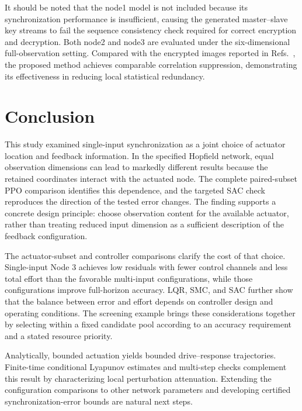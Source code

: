 \documentclass[a4paper,fleqn]{cas-dc}
\theoremstyle{plain}
\theoremstyle{definition}
\begin{document}
It should be noted that the node1 model is not included because its synchronization performance is insufficient, causing the generated master--slave key streams to fail the sequence consistency check required for correct encryption and decryption. Both node2 and node3 are evaluated under the six-dimensional full-observation setting. Compared with the encrypted images reported in Refs.~\cite{li2024novel,verma2025quantum}, the proposed method achieves comparable correlation suppression, demonstrating its effectiveness in reducing local statistical redundancy.




\section{Conclusion}
\label{sec:conclusion}

This study examined single-input synchronization as a joint choice of actuator location and feedback information. In the specified Hopfield network, equal observation dimensions can lead to markedly different results because the retained coordinates interact with the actuated node. The complete paired-subset PPO comparison identifies this dependence, and the targeted SAC check reproduces the direction of the tested error changes. The finding supports a concrete design principle: choose observation content for the available actuator, rather than treating reduced input dimension as a sufficient description of the feedback configuration.

The actuator-subset and controller comparisons clarify the cost of that choice. Single-input Node 3 achieves low residuals with fewer control channels and less total effort than the favorable multi-input configurations, while those configurations improve full-horizon accuracy. LQR, SMC, and SAC further show that the balance between error and effort depends on controller design and operating conditions. The screening example brings these considerations together by selecting within a fixed candidate pool according to an accuracy requirement and a stated resource priority.

Analytically, bounded actuation yields bounded drive--response trajectories. Finite-time conditional Lyapunov estimates and multi-step checks complement this result by characterizing local perturbation attenuation. Extending the configuration comparisons to other network parameters and developing certified synchronization-error bounds are natural next steps.
\end{document}
